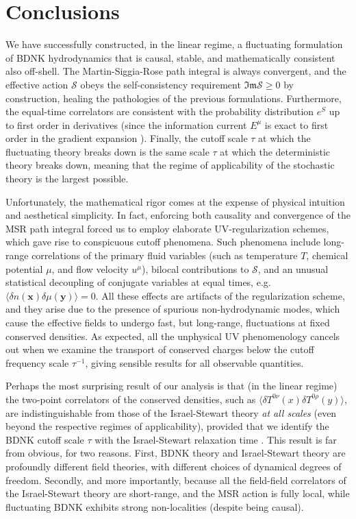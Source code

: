 \documentclass[a4paper, amsfonts, amssymb, amsmath, reprint, showkeys, nofootinbib, twoside,notitlepage,onecolumn]{revtex4-2}
\theoremstyle{definition}
\begin{document}
\section{Conclusions}

We have successfully constructed, in the linear regime, a fluctuating formulation of BDNK hydrodynamics that is causal, stable, and mathematically consistent also off-shell. The Martin-Siggia-Rose path integral is always convergent, and the effective action $\mathcal{S}$ obeys the self-consistency requirement $\mathfrak{Im}\mathcal{S}\geq 0$ by construction, healing the pathologies of the previous formulations. Furthermore, the equal-time correlators are consistent with the probability distribution $e^S$ up to first order in derivatives (since the information current $E^\mu$ is exact to first order in the gradient expansion \cite{Gavassino:2024ufs}). Finally, the cutoff scale $\tau$ at which the fluctuating theory breaks down is the same scale $\tau$ at which the deterministic theory breaks down, meaning that the regime of applicability of the stochastic theory is the largest possible.

Unfortunately, the mathematical rigor comes at the expense of physical intuition and aesthetical simplicity. In fact, enforcing both causality and convergence of the MSR path integral forced us to employ elaborate UV-regularization schemes, which gave rise to conspicuous cutoff phenomena. Such phenomena include long-range correlations of the primary fluid variables (such as temperature $T$, chemical potential $\mu$, and flow velocity $u^\mu$), bilocal contributions to $\mathcal{S}$, and an unusual statistical decoupling of conjugate variables at equal times, e.g. $\langle \delta n(\textbf{x}) \delta \mu(\textbf{y}) \rangle=0$. All these effects are artifacts of the regularization scheme, and they arise due to the presence of spurious non-hydrodynamic modes, which cause the effective fields to undergo fast, but long-range, fluctuations at fixed conserved densities. As expected, all the unphysical UV phenomenology cancels out when we examine the transport of conserved charges below the cutoff frequency scale $\tau^{-1}$, giving sensible results for all observable quantities. 

Perhaps the most surprising result of our analysis is that (in the linear regime) the two-point correlators of the conserved densities, such as $\langle \delta T^{0\nu}(x)\delta T^{0\rho}(y)\rangle$, are indistinguishable from those of the Israel-Stewart theory \cite{Mullins:2023tjg} \textit{at all scales} (even beyond the respective regimes of applicability), provided that we identify the BDNK cutoff scale $\tau$ with the Israel-Stewart relaxation time \cite{Israel_Stewart_1979}.
This result is far from obvious, for two reasons. First, BDNK theory and Israel-Stewart theory are profoundly different field theories, with different choices of dynamical degrees of freedom. Secondly, and more importantly, because all the field-field correlators of the Israel-Stewart theory are short-range, and the MSR action is fully local, while fluctuating BDNK exhibits strong non-localities (despite being causal). 
\end{document}
